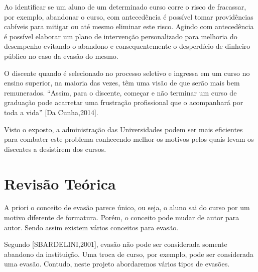 Ao identificar se um aluno de um determinado curso corre o risco de fracassar, por exemplo, abandonar o curso, com antecedência é possível tomar providências cabíveis para mitigar ou até mesmo eliminar este risco. Agindo com antecedência é possível elaborar um plano de intervenção personalizado para melhoria do desempenho evitando o abandono e consequentemente o desperdício de dinheiro público no caso da evasão do mesmo.

O discente quando é selecionado no processo seletivo e ingressa em um curso no ensino superior, na maioria das vezes, têm uma visão de que serão mais bem remunerados. “Assim, para o discente, começar e não terminar um curso de graduação pode acarretar uma frustração profissional que o acompanhará por toda a vida” [Da Cunha,2014].

Visto o exposto, a administração das Universidades podem ser mais eficientes para combater este problema conhecendo melhor os motivos pelos quais levam os discentes a desistirem dos cursos.  
 \begin{comment} 
\section{Metodologia}%

Para realização do estudo serão usadas como fonte as bases de dados dos sistemas de controle acadêmicos da Universidade de Brasília, com enfoque no ciclo de vida acadêmico dos discentes e docentes. Aplicar técnicas de mineração de dados para a descoberta de novos padrões relacionados as diversas formas de evasões dos cursos ofertados pela UnB para que possam prever tendências que  auxiliarão a equipe de planejamento a acompanhar e definir as metas e diretrizes da Universidade no âmbito acadêmico.
\end{comment}

\section{Revisão Teórica}%

A priori o conceito de evasão parece único, ou seja, o aluno sai do curso por um motivo diferente de formatura.  Porém, o conceito pode mudar de autor para autor. Sendo assim existem vários conceitos para evasão. 

Segundo [SBARDELINI,2001], evasão não pode ser considerada somente abandono da instituição. Uma troca de curso, por exemplo, pode ser considerada uma evasão. Contudo, neste projeto abordaremos vários tipos de evasões.
 
